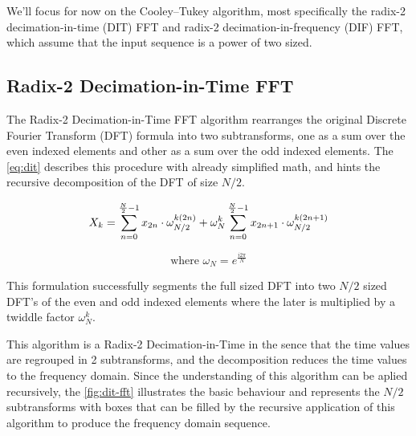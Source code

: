 \documentclass[
  oneside,
  11pt, a4paper,
  footinclude=true,
  headinclude=true,
  cleardoublepage=empty
]{scrbook}
\begin{document}
We'll focus for now on the Cooley–Tukey algorithm, most specifically the radix-2 decimation-in-time (DIT) FFT and radix-2 decimation-in-frequency (DIF) FFT, which assume that the input sequence is a power of two sized.


\subsection{Radix-2 Decimation-in-Time FFT} \label{subsec:radix-2-decimation-in-time-fft}


The Radix-2 Decimation-in-Time FFT algorithm rearranges the original Discrete Fourier Transform (DFT) formula into two subtransforms, one as a sum over the even indexed elements and other as a sum over the odd indexed elements. The \autoref{eq:dit} describes this procedure with already simplified math, and hints the recursive decomposition of the DFT of size \(N/2\).

\begin{equation} \label{eq:dit}
    X_{k} = \sum_{n=0}^{\frac{N}{2}-1}x_{2n} \cdot \omega_{N/2}^{k(2n)} + \omega_{N}^{k} \sum_{n=0}^{\frac{N}{2}-1}x_{2n+1} \cdot \omega_{N/2}^{k(2n+1)} \\
\end{equation}

\begin{equation*}
    \text{where } \omega_{N} = e^{\frac{i 2 \pi}{N}}
\end{equation*}

This formulation successfully segments the full sized DFT into two \(N/2\) sized DFT's of the even and odd indexed elements where the later is multiplied by a twiddle factor \( \omega_{N}^{k} \). 

This algorithm is a Radix-2 Decimation-in-Time in the sence that the time values are regrouped in 2 subtransforms, and the decomposition reduces the time values to the frequency domain. Since the understanding of this algorithm can be aplied recursively, the \autoref{fig:dit-fft} illustrates the basic behaviour and represents the \(N/2\) subtransforms with boxes that can be filled by the recursive application of this algorithm to produce the frequency domain sequence.


\end{document}
